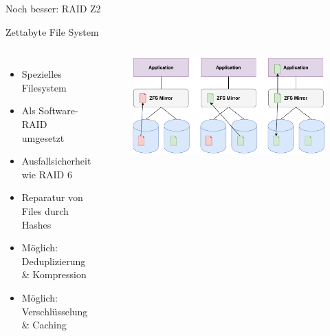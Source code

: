 \documentclass[10pt]{beamer}
\begin{document}
%
%
\begin{frame}[fragile]{Noch besser: RAID Z2}
\begin{alertblock}{Zettabyte File System}
\end{alertblock}
\begin{columns}[T,c,onlytextwidth]
\begin{itemize}
	\item Spezielles Filesystem
	\item Als Software-RAID umgesetzt
	\item Ausfallsicherheit wie RAID 6
	\item Reparatur von Files durch Hashes
	\item Möglich: Deduplizierung \& Kompression
	\item Möglich: Verschlüsselung \& Caching
\end{itemize}
	\begin{figure}
		\includegraphics[width=1\textwidth]{images/zfs-self-healing}
	\end{figure}
\end{columns}
\end{frame}
\end{document}
